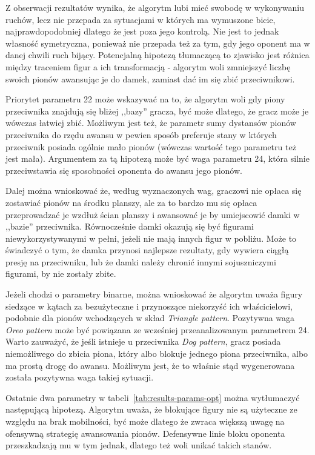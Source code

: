 Z obserwacji rezultatów wynika, że algorytm lubi mieć swobodę w wykonywaniu ruchów, lecz nie przepada za sytuacjami w których ma wymuszone bicie, najprawdopodobniej dlatego że jest poza jego kontrolą. Nie jest to jednak własność symetryczna, ponieważ nie przepada też za tym, gdy jego oponent ma w danej chwili ruch bijący. Potencjalną hipotezą tłumaczącą to zjawisko jest różnica między traceniem figur a ich transformacją - algorytm woli zmniejszyć liczbę swoich pionów awansując je do damek, zamiast dać im się zbić przeciwnikowi.

Priorytet parametru 22 może wskazywać na to, że algorytm woli gdy piony przeciwnika znajdują się bliżej ,,bazy'' gracza, być może dlatego, że gracz może je wówczas łatwiej zbić. Możliwym jest też, że parametr sumy dystansów pionów przeciwnika do rzędu awansu w pewien sposób preferuje stany w których przeciwnik posiada ogólnie mało pionów (wówczas wartość tego parametru też jest mała). Argumentem za tą hipotezą może być waga parametru 24, która silnie przeciwstawia się sposobności oponenta do awansu jego pionów.

Dalej można wnioskować że, według wyznaczonych wag, graczowi nie opłaca się zostawiać pionów na środku planszy, ale za to bardzo mu się opłaca przeprowadzać je wzdłuż ścian planszy i awansować je by umiejscowić damki w ,,bazie'' przeciwnika. Równocześnie damki okazują się być figurami niewykorzystywanymi w pełni, jeżeli nie mają innych figur w pobliżu. Może to świadczyć o tym, że damka przynosi najlepsze rezultaty, gdy wywiera ciągłą presję na przeciwniku, lub że damki należy chronić innymi sojuszniczymi figurami, by nie zostały zbite.

Jeżeli chodzi o parametry binarne, można wnioskować że algorytm uważa figury siedzące w kątach za bezużyteczne i przynoszące niekorzyść ich właścicielowi, podobnie dla pionów wchodzących w skład \textit{Triangle pattern}. Pozytywna waga \textit{Oreo pattern} może być powiązana ze wcześniej przeanalizowanym parametrem 24. Warto zauważyć, że jeśli istnieje u przeciwnika \textit{Dog pattern}, gracz posiada niemożliwego do zbicia piona, który albo blokuje jednego piona przeciwnika, albo ma prostą drogę do awansu. Możliwym jest, że to właśnie stąd wygenerowana została pozytywna waga takiej sytuacji.

Ostatnie dwa parametry w tabeli~\ref{tab:results-params-opt} można wytłumaczyć następującą hipotezą. Algorytm uważa, że blokujące figury nie są użyteczne ze względu na brak mobilności, być może dlatego że zwraca większą uwagę na ofensywną strategię awansowania pionów. Defensywne linie bloku oponenta przeszkadzają mu w tym jednak, dlatego też woli unikać takich stanów.

